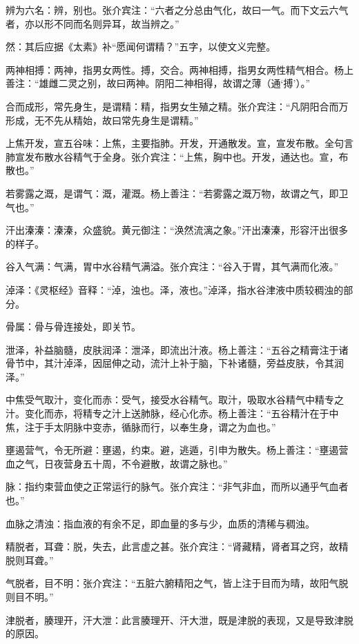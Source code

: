 \documentclass[12pt]{ctexbook}
\begin{document}
\begin{jiaozhu}
	\item 辨为六名：辨，别也。张介宾注：“六者之分总由气化，故曰一气。而下文云六气者，亦以形不同而名则异耳，故当辨之。”
	\item 然：其后应据《太素》补“愿闻何谓精？”五字，以使文义完整。
	\item 两神相搏：两神，指男女两性。搏，交合。两神相搏，指男女两性精气相合。杨上善注：“雄雌二灵之别，故曰两神。阴阳二神相得，故谓之薄（通‘搏’）。”
	\item 合而成形，常先身生，是谓精：精，指男女生殖之精。张介宾注：“凡阴阳合而万形成，无不先从精始，故曰常先身生是谓精。”
	\item 上焦开发，宣五谷味：上焦，主要指肺。开发，开通散发。宣，宣发布散。全句言肺宣发布散水谷精气于全身。张介宾注：“上焦，胸中也。开发，通达也。宣，布散也。”
	\item 若雾露之溉，是谓气：溉，灌溉。杨上善注：“若雾露之溉万物，故谓之气，即卫气也。”
	\item 汗出溱溱：溱溱，众盛貌。黄元御注：“涣然流漓之象。”汗出溱溱，形容汗出很多的样子。
	\item 谷入气满：气满，胃中水谷精气满溢。张介宾注：“谷入于胃，其气满而化液。”
	\item 淖泽：《灵枢经》音释：“淖，浊也。泽，液也。”淖泽，指水谷津液中质较稠浊的部分。
	\item 骨属：骨与骨连接处，即关节。
	\item 泄泽，补益脑髓，皮肤润泽：泄泽，即流出汁液。杨上善注：“五谷之精膏注于诸骨节中，其汁淖泽，因屈伸之动，流汁上补于脑，下补诸髓，旁益皮肤，令其润泽。”
	\item 中焦受气取汁，变化而赤：受气，接受水谷精气。取汁，吸取水谷精气中精专之汁。变化而赤，将精专之汁上送肺脉，经心化赤。杨上善注：“五谷精汁在于中焦，注于手太阴脉中变赤，循脉而行，以奉生身，谓之为血也。”
	\item 壅遏营气，令无所避：壅遏，约束。避，逃遁，引申为散失。杨上善注：“壅遏营血之气，日夜营身五十周，不令避散，故谓之脉也。”
	\item 脉：指约束营血使之正常运行的脉气。张介宾注：“非气非血，而所以通乎气血者也。”
	\item 血脉之清浊：指血液的有余不足，即血量的多与少，血质的清稀与稠浊。
	\item 精脱者，耳聋：脱，失去，此言虚之甚。张介宾注：“肾藏精，肾者耳之窍，故精脱则耳聋。”
	\item 气脱者，目不明：张介宾注：“五脏六腑精阳之气，皆上注于目而为晴，故阳气脱则目不明。”
	\item 津脱者，腠理开，汗大泄：此言腠理开、汗大泄，既是津脱的表现，又是导致津脱的原因。

\end{jiaozhu}
\end{document}
